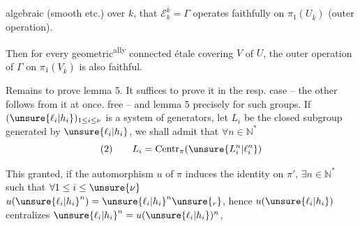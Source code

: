 
 algebraic (smooth etc.) over $k$,  that $\mathcal E_k^{\bar k}=\Gamma$ operates faithfully on $\pi_1(U_{\bar k})$ (outer operation).

Then for every geometric\textsuperscript{ally} connected étale covering $V$ of $U$, the outer operation of \deleted{\unsure{$\pi$}} $\Gamma$ on $\pi_1(V_{\bar k})$ is also faithful.

Remains to prove lemma 5. It suffices to prove it in the resp. case -- the other follows from it at once.    free -- and lemma 5  precisely for such groups. If $(\unsure{\ell_i|h_i})_{1\le i\le\nu}$ is a system of generators, let $L_i$ be the closed subgroup generated by $\unsure{\ell_i|h_i}$, we shall admit that $\forall n\in\mathbb N^*$
\[
(2)\qquad L_i=\operatorname{Centr}_{\pi}(\unsure{L_i^n|\ell_i^n})
\]

This granted, if the automorphism $u$ of $\pi$ induces the identity on $\pi'$, $\exists n\in\mathbb N^*$ such that $\forall 1\le i\le\unsure{\nu}$
$u(\unsure{\ell_i|h_i}^{n})=\unsure{\ell_i|h_i}^{n}\unsure{{}_r}$, hence $u(\unsure{\ell_i|h_i})$ centralizes $\unsure{\ell_i|h_i}^{n}=u(\unsure{\ell_i|h_i})^{n}$,

